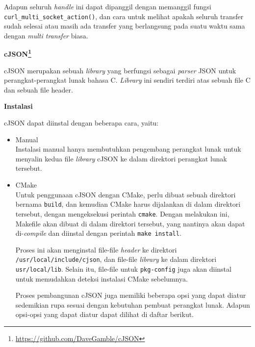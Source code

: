 \documentclass[a4paper,twoside]{article}
\begin{document}
\begin{enumerate}
Adapun seluruh \textit{handle} ini dapat dipanggil dengan memanggil fungsi \verb|curl_multi_socket_action()|, dan cara untuk melihat apakah seluruh transfer sudah selesai atau masih ada transfer yang berlangsung pada suatu waktu sama dengan \textit{multi transfer} biasa.

\textbf{cJSON\footnote{\href{https://github.com/DaveGamble/cJSON}{https://github.com/DaveGamble/cJSON}}}

cJSON merupakan sebuah \textit{library} yang berfungsi sebagai \textit{parser} JSON untuk perangkat-perangkat lunak bahasa C. \textit{Library} ini sendiri terdiri atas sebuah file C dan sebuah file header.

\textbf{Instalasi}

cJSON dapat diinstal dengan beberapa cara, yaitu:

\begin{itemize}
	\item Manual\\
	Instalasi manual hanya membutuhkan pengembang perangkat lunak untuk menyalin kedua file \textit{library} cJSON ke dalam direktori perangkat lunak tersebut.
	\item CMake\\
	Untuk penggunaan cJSON dengan CMake, perlu dibuat sebuah direktori bernama \verb|build|, dan kemudian CMake harus dijalankan di dalam direktori tersebut, dengan mengeksekusi perintah \verb|cmake|. Dengan melakukan ini, Makefile akan dibuat di dalam direktori tersebut, yang nantinya akan dapat di-\textit{compile} dan diinstal dengan perintah \verb|make install|.
	
	Proses ini akan menginstal file-file \textit{header} ke direktori \verb|/usr/local/include/cjson|, dan file-file \textit{library} ke dalam direktori \verb|usr/local/lib|. Selain itu, file-file untuk \verb|pkg-config| juga akan diinstal untuk memudahkan deteksi instalasi CMake sebelumnya.
	
	Proses pembangunan cJSON juga memiliki beberapa opsi yang dapat diatur sedemikian rupa sesuai dengan kebutuhan pembuat perangkat lunak. Adapun opsi-opsi yang dapat diatur dapat dilihat di daftar berikut.


\end{itemize}
\end{enumerate}
\end{document}
